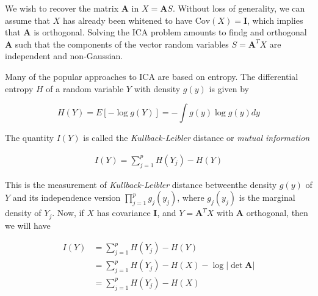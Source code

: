 \documentclass{article}
\begin{document}
We wish to recover the matrix $\pmb A$ in $X = \pmb A S$. Without loss of generality, we can assume that $X$ has already been whitened to have $\text{Cov}(X) = \mathbf I$, which implies that $\pmb A$ is orthogonal. Solving the ICA problem amounts to findg and orthogonal $\pmb A$ such that the components of the vector random variables $S = \pmb A^T X$ are independent and non-Gaussian.

Many of the popular approaches to ICA are based on entropy. The differential entropy $H$ of a random variable $Y$ with density $g(y)$ is given by

\begin{equation}
	H(Y) = E[-\log g(Y)] = -\int g(y)\log g(y) dy
\end{equation}

The quantity $I(Y)$ is called the \textit{Kullback-Leibler} distance or \textit{mutual information}

\begin{equation}
\begin{aligned}
		I(Y) = \sum_{j=1}^p H(Y_j) - H(Y)
\end{aligned}
\end{equation}


This is the measurement of \textit{Kullback-Leibler} distance betweenthe density $g(y)$ of $Y$ and its independence version $\prod_{j=1}^p g_j(y_j)$, where $g_j(y_j)$ is the marginal density of $Y_j$. Now, if $X$ has covariance $\mathbf I$, and $Y = \pmb A^T X$ with $\pmb A$ orthogonal, then we will have

\begin{align}
	I(Y) & = \sum_{j=1}^p H(Y_j) - H(Y) \\
	& = \sum_{j=1}^p H(Y_j) - H(X) - \log |\det \pmb A|\\
	& = \sum_{j=1}^p H(Y_j) - H(X)
\end{align}
\end{document}
